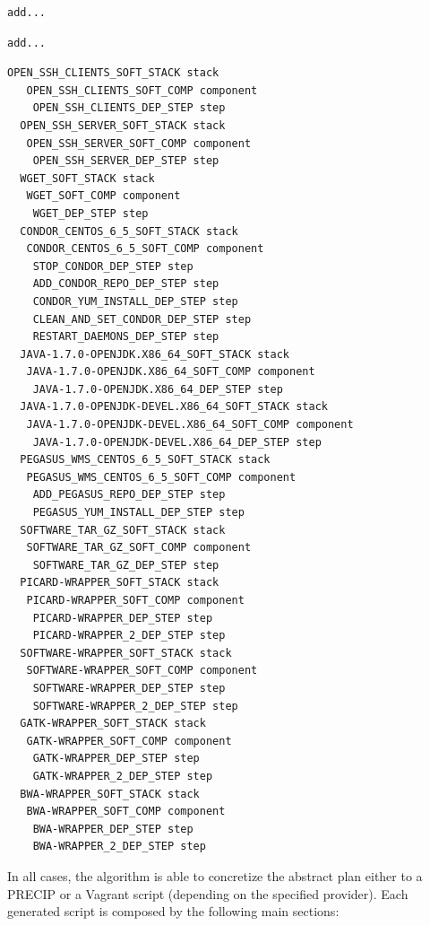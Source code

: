 \begin{lstlisting}[caption={Abstract deployment plan of the Montage WF},label={lst:plan-montge}]
add...
\end{lstlisting}


\begin{lstlisting}[caption={Abstract deployment plan of the Epigenomics WF},label={lst:plan-epigenomics}]
add...
\end{lstlisting}


\begin{lstlisting}[caption={Abstract deployment plan of the SoyKB WF},label={lst:plan-soykb}]
  OPEN_SSH_CLIENTS_SOFT_STACK stack
   OPEN_SSH_CLIENTS_SOFT_COMP component
    OPEN_SSH_CLIENTS_DEP_STEP step
  OPEN_SSH_SERVER_SOFT_STACK stack
   OPEN_SSH_SERVER_SOFT_COMP component
    OPEN_SSH_SERVER_DEP_STEP step
  WGET_SOFT_STACK stack
   WGET_SOFT_COMP component
    WGET_DEP_STEP step
  CONDOR_CENTOS_6_5_SOFT_STACK stack
   CONDOR_CENTOS_6_5_SOFT_COMP component
    STOP_CONDOR_DEP_STEP step
    ADD_CONDOR_REPO_DEP_STEP step
    CONDOR_YUM_INSTALL_DEP_STEP step
    CLEAN_AND_SET_CONDOR_DEP_STEP step
    RESTART_DAEMONS_DEP_STEP step
  JAVA-1.7.0-OPENJDK.X86_64_SOFT_STACK stack
   JAVA-1.7.0-OPENJDK.X86_64_SOFT_COMP component
    JAVA-1.7.0-OPENJDK.X86_64_DEP_STEP step
  JAVA-1.7.0-OPENJDK-DEVEL.X86_64_SOFT_STACK stack
   JAVA-1.7.0-OPENJDK-DEVEL.X86_64_SOFT_COMP component
    JAVA-1.7.0-OPENJDK-DEVEL.X86_64_DEP_STEP step
  PEGASUS_WMS_CENTOS_6_5_SOFT_STACK stack
   PEGASUS_WMS_CENTOS_6_5_SOFT_COMP component
    ADD_PEGASUS_REPO_DEP_STEP step
    PEGASUS_YUM_INSTALL_DEP_STEP step
  SOFTWARE_TAR_GZ_SOFT_STACK stack
   SOFTWARE_TAR_GZ_SOFT_COMP component
    SOFTWARE_TAR_GZ_DEP_STEP step
  PICARD-WRAPPER_SOFT_STACK stack
   PICARD-WRAPPER_SOFT_COMP component
    PICARD-WRAPPER_DEP_STEP step
    PICARD-WRAPPER_2_DEP_STEP step
  SOFTWARE-WRAPPER_SOFT_STACK stack
   SOFTWARE-WRAPPER_SOFT_COMP component
    SOFTWARE-WRAPPER_DEP_STEP step
    SOFTWARE-WRAPPER_2_DEP_STEP step
  GATK-WRAPPER_SOFT_STACK stack
   GATK-WRAPPER_SOFT_COMP component
    GATK-WRAPPER_DEP_STEP step
    GATK-WRAPPER_2_DEP_STEP step
  BWA-WRAPPER_SOFT_STACK stack
   BWA-WRAPPER_SOFT_COMP component
    BWA-WRAPPER_DEP_STEP step
    BWA-WRAPPER_2_DEP_STEP step
\end{lstlisting}

In all cases, the algorithm is able to concretize the abstract plan either to a PRECIP or a Vagrant script (depending on the specified provider). Each generated script is composed by the following main sections:

